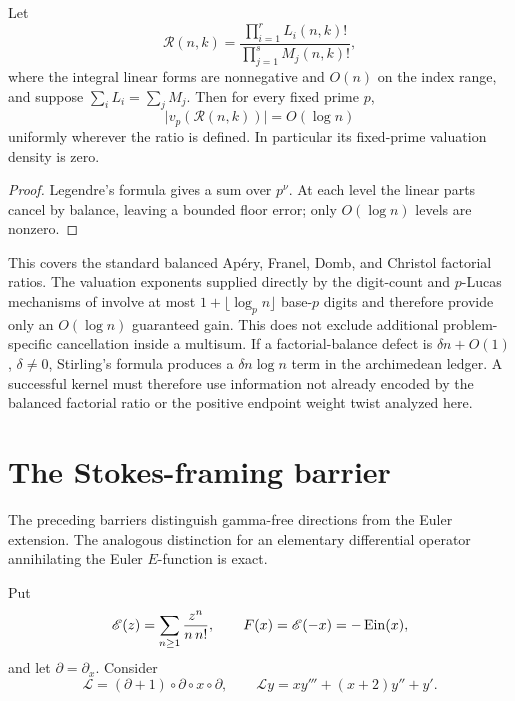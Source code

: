\begin{proposition}
\label{prop:balanced-factorial-fixed-p}
Let
\[
 \mathcal R(n,k)=
 \frac{\prod_{i=1}^rL_i(n,k)!}{\prod_{j=1}^sM_j(n,k)!},
\]
where the integral linear forms are nonnegative and \(O(n)\) on the index
range, and suppose \(\sum_iL_i=\sum_jM_j\).  Then for every fixed prime
\(p\),
\[
 \lvert v_p(\mathcal R(n,k))\rvert=O(\log n)
\]
uniformly wherever the ratio is defined.  In particular its fixed-prime
valuation density is zero.
\end{proposition}

\begin{proof}
Legendre's formula gives a sum over \(p^\nu\).  At each level the linear
parts cancel by balance, leaving a bounded floor error; only
\(O(\log n)\) levels are nonzero.
\end{proof}

\begin{remark}
This covers the standard balanced Ap\'ery, Franel, Domb, and Christol
factorial ratios.  The valuation exponents supplied directly by the
digit-count and \(p\)-Lucas mechanisms of \cite{Delaygue2018} involve at
most \(1+\lfloor\log_p n\rfloor\) base-\(p\) digits and therefore provide
only an \(O(\log n)\) guaranteed gain.  This does not exclude additional
problem-specific cancellation inside a multisum.  If a factorial-balance
defect is \(\delta n+O(1)\), \(\delta\ne0\), Stirling's formula produces a
\(\delta n\log n\) term in the archimedean ledger.  A successful kernel
must therefore use information not already encoded by the balanced
factorial ratio or the positive endpoint weight twist analyzed here.
\end{remark}

\section{The Stokes-framing barrier}
\label{sec:stokes-framing}

The preceding barriers distinguish gamma-free directions from the Euler
extension.  The analogous distinction for an elementary differential
operator annihilating the Euler \(E\)-function is exact.

Put
\[
 \mathscr E(z)=\sum_{n\ge1}\frac{z^n}{n\,n!},
 \qquad F(x)=\mathscr E(-x)=-\operatorname{Ein}(x),
\]
and let \(\partial=\partial_x\).  Consider
\begin{equation}\label{eq:euler-E-operator}
 \mathcal L=(\partial+1)\circ\partial\circ x\circ\partial,
 \qquad
 \mathcal Ly=xy'''+(x+2)y''+y'.
\end{equation}

